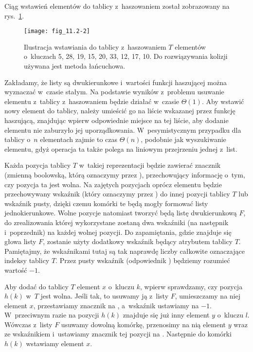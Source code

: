 \exercise %
Ciąg wstawień elementów do tablicy z~haszowaniem został zobrazowany na rys.\ \ref{fig:11.2-2}.
\medskip
\begin{figure}[ht!]
	\begin{center}
		\texttt{[image: fig\_11.2-2]}
	\end{center}
	\caption{Ilustracja wstawiania do tablicy z~haszowaniem $T$ elementów o~kluczach 5, 28, 19, 15, 20, 33, 12, 17, 10.
Do rozwiązywania kolizji używana jest metoda łańcuchowa.} \label{fig:11.2-2}
\end{figure}

\exercise %
Zakładamy, że listy są dwukierunkowe i~wartości funkcji haszującej można wyznaczać w~czasie stałym.
Na podstawie wyników z~problemu  usuwanie elementu z~tablicy z~haszowaniem będzie działać w~czasie $\Theta(1)$.
Aby wstawić nowy element do tablicy, należy umieścić go na liście wskazanej przez funkcję haszującą, znajdując wpierw odpowiednie miejsce na tej liście, aby dodanie elementu nie zaburzyło jej uporządkowania.
W~pesymistycznym przypadku dla tablicy o~$n$ elementach zajmie to czas $\Theta(n)$, podobnie jak wyszukiwanie elementu, gdyż operacja ta także polega na liniowym przejrzeniu jednej z~list.

\exercise %
Każda pozycja tablicy $T$ w~takiej reprezentacji będzie zawierać znacznik (zmienną boolowską, którą oznaczymy przez ), przechowujący informację o~tym, czy pozycja ta jest wolna.
Na zajętych pozycjach oprócz elementu będzie przechowywany wskaźnik (który oznaczymy przez ) do innej pozycji tablicy $T$ lub wskaźnik pusty, dzięki czemu komórki te będą mogły formować listy jednokierunkowe.
Wolne pozycje natomiast tworzyć będą listę dwukierunkową $F$, do zrealizowania której wykorzystane zostaną dwa wskaźniki (na następnik i~poprzednik) na każdej wolnej pozycji.
Do zapamiętania, gdzie znajduje się głowa listy $F$, zostanie użyty dodatkowy wskaźnik będący atrybutem tablicy $T$.
Pamiętajmy, że wskaźnikami tutaj są tak naprawdę liczby całkowite oznaczające indeksy tablicy $T$.
Przez pusty wskaźnik (odpowiednik ) będziemy rozumieć wartość $-1$.

Aby dodać do tablicy $T$ element $x$ o~kluczu $k$, wpierw sprawdzamy, czy pozycja $h(k)$ w~$T$ jest wolna.
Jeśli tak, to usuwamy ją z~listy $F$, umieszczamy na niej element $x$, przestawiamy znacznik  na , a~wskaźnik  ustawiamy na $-1$.
W~przeciwnym razie na pozycji $h(k)$ znajduje się już inny element $y$ o~kluczu $l$.
Wówczas z~listy $F$ usuwamy dowolną komórkę, przenosimy na nią element $y$ wraz ze wskaźnikiem  i~ustawiamy znacznik  tej pozycji na .
Następnie do komórki $h(k)$ wstawiamy element $x$.


